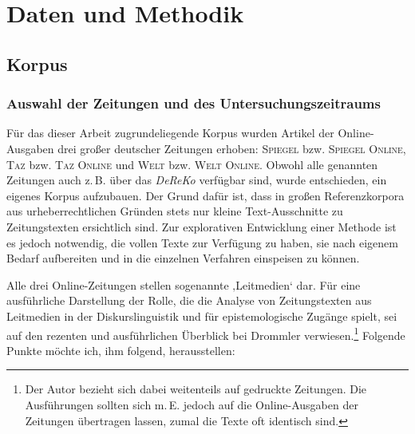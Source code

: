 \chapter{Daten und Methodik}\label{daten-und-methodik}

\section{Korpus}\label{korpus}

\subsection{Auswahl der Zeitungen und des Untersuchungszeitraums}\label{auswahl-der-zeitungen-und-des-untersuchungszeitraums}

Für das dieser Arbeit zugrundeliegende Korpus wurden Artikel der Online-Ausgaben drei großer deutscher Zeitungen erhoben: \textsc{Spiegel} bzw. \textsc{Spiegel} \textsc{Online}, \textsc{Taz} bzw. \textsc{Taz} \textsc{Online} und \textsc{Welt} bzw. \textsc{Welt} \textsc{Online}. Obwohl alle genannten Zeitungen auch z.\,B. über das \emph{DeReKo} verfügbar sind, wurde entschieden, ein eigenes Korpus aufzubauen. Der Grund dafür ist, dass in großen Referenzkorpora aus urheberrechtlichen Gründen stets nur kleine Text-Ausschnitte zu Zeitungstexten ersichtlich sind. Zur explorativen Entwicklung einer Methode ist es jedoch notwendig, die vollen Texte zur Verfügung zu haben, sie nach eigenem Bedarf aufbereiten und in die einzelnen Verfahren einspeisen zu können.

Alle drei Online-Zeitungen stellen sogenannte ‚Leitmedien` \autocite{jarrenLeitmedienAlsQualitaetsmedien2011} dar. Für eine ausführliche Darstellung der Rolle, die die Analyse von Zeitungstexten aus Leitmedien in der Diskurslinguistik und für epistemologische Zugänge spielt, sei auf den rezenten und ausführlichen Überblick bei Drommler \autocite*{drommlerNationaleIdentitaetBerliner2024} verwiesen.\footnote{Der Autor bezieht sich dabei weitenteils auf gedruckte Zeitungen. Die Ausführungen sollten sich m.\,E. jedoch auf die Online-Ausgaben der Zeitungen übertragen lassen, zumal die Texte oft identisch sind.} Folgende Punkte möchte ich, ihm folgend, herausstellen:

